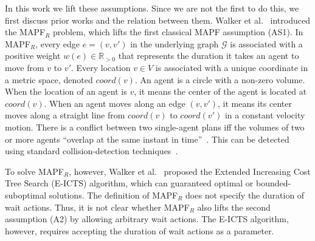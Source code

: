 \documentclass[review]{elsarticle}
\newcommand\roni[1]{\nb{\textbf{Roni:}}{green}{#1}}
\newcommand{\mapfr}{\ac{MAPF}$_R$\xspace}
\newcommand{\mapf}{\ac{MAPF}\xspace}
\newcommand{\coord}{\textit{coord}\xspace}
\begin{document}



In this work we lift these assumptions. 
Since we are not the first to do this, we first discuss prior works and the relation between them. 
Walker et al.~\cite{walker2018extended} introduced the \mapfr problem, which lifts the first classical \mapf assumption (AS1). 
In \mapfr, every edge $e=(v,v')$ in the underlying graph $\mathcal{G}$ is associated with a positive weight $w(e)\in \mathbb{R}_{>0}$ that represents the duration it takes an agent to move from $v$ to $v'$. 
Every location $v\in V$ is associated with a unique coordinate in a metric space, denoted $\coord(v)$. 
An agent is a circle with a non-zero volume. 
When the location of an agent is $v$, it means the center of the agent is located at $\coord(v)$. 
When an agent moves along an edge $(v,v')$, it means
its center moves along a straight line from $\coord(v)$ to $\coord(v')$ in a constant velocity motion. 
There is a conflict between two single-agent plans iff the volumes of two or more agents ``overlap at the same instant in time''~\cite{walker2018extended}. This can be detected using standard collision-detection techniques~\cite{guy2015,jimenez20013d}.


To solve \mapfr, however, Walker et al.~\cite{walker2018extended} proposed the Extended Increasing Cost Tree Search (E-ICTS) algorithm, which can guaranteed  optimal or  bounded-suboptimal solutions. 
The definition of \mapfr does not specify the duration of wait actions. 
Thus, it is not clear whether \mapfr also lifts the second assumption (A2) by allowing arbitrary wait actions. The E-ICTS algorithm, however, requires accepting the duration of wait actions as a parameter. 
\end{document}
